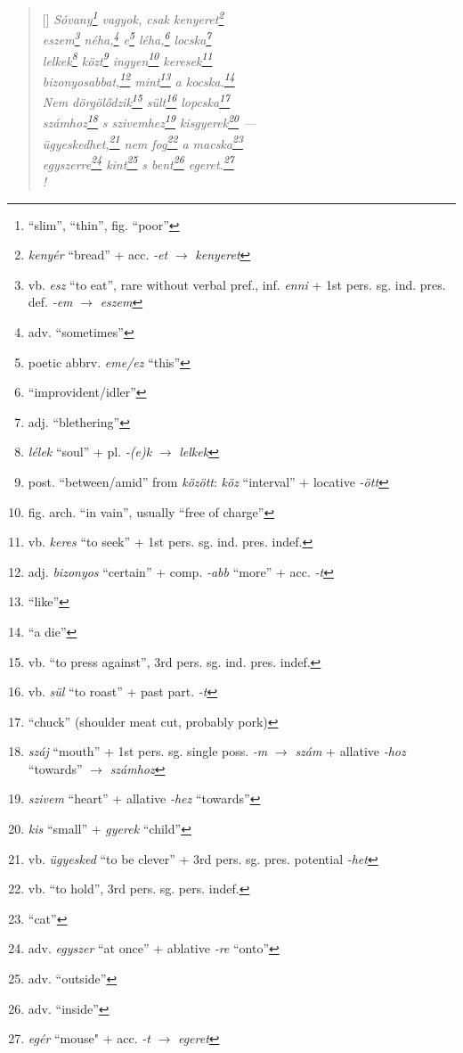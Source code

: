 \documentclass[a4paper,12pt,twoside,final]{book}
\begin{document}
\begin{verse}[\versewidth]
  \it
  Sóvany\footnote{``slim'', ``thin'', fig. ``poor''} vagyok, csak
  kenyeret\footnote{\emph{kenyér} ``bread'' + acc. \emph{-et}
  $\rightarrow$ \emph{kenyeret}} \\
  eszem\footnote{vb. \emph{esz} ``to eat'', rare without verbal
  pref., inf. \emph{enni} + 1st pers. sg. ind. pres. def. \emph{-em}
  $\rightarrow$ \emph{eszem}} néha,\footnote{adv. ``sometimes''} e\footnote{poetic
  abbrv. \emph{eme/ez} ``this''} léha,\footnote{``improvident/idler''}
  locska\footnote{adj. ``blethering''} \\
  lelkek\footnote{\emph{lélek} ``soul'' +
  pl. \emph{-(e)k} $\rightarrow$ \emph{lelkek}}
  közt\footnote{post. ``between/amid'' from \emph{között}: \emph{köz}
  ``interval'' + locative \emph{-ött}} ingyen\footnote{fig. arch. ``in
  vain'', usually ``free of charge''} keresek\footnote{vb.
  \emph{keres} ``to seek'' + 1st pers. sg. ind. pres. indef.} \\
  bizonyosabbat,\footnote{adj. \emph{bizonyos} ``certain'' +
  comp. \emph{-abb} ``more'' + acc. \emph{-t}} mint\footnote{``like''} a
  kocska.\footnote{``a die''} \\
  Nem dörgölődzik\footnote{vb. ``to press against'', 3rd
  pers. sg. ind. pres. indef.} sült\footnote{vb. \emph{sül} ``to
  roast''  + past part. \emph{-t}} lopcska\footnote{``chuck''
  (shoulder meat cut, probably pork)} \\
  számhoz\footnote{\emph{száj} ``mouth'' + 1st
  pers. sg. single poss. \emph{-m} $\rightarrow$ \emph{szám} +
  allative \emph{-hoz} ``towards'' $\rightarrow$ \emph{számhoz}} s
  szivemhez\footnote{\emph{szivem} ``heart'' +
  allative \emph{-hez} ``towards''} kisgyerek\footnote{\emph{kis} ``small'' +
  \emph{gyerek} ``child''} --- \\
  ügyeskedhet,\footnote{vb. \emph{ügyesked} ``to be clever'' +
  3rd pers. sg. pres. potential \emph{-het}} nem fog\footnote{vb.
  ``to hold'', 3rd pers. sg. pers. indef.} a macska\footnote{``cat''} \\
  egyszerre\footnote{adv. \emph{egyszer} ``at once'' +
  ablative \emph{-re} ``onto''} kint\footnote{adv. ``outside''} s
  bent\footnote{adv. ``inside''} egeret.\footnote{\emph{egér}
  ``mouse" + acc. \emph{-t} $\rightarrow$ \emph{egeret}} \\!
\end{verse}

\newpage

\end{document}
